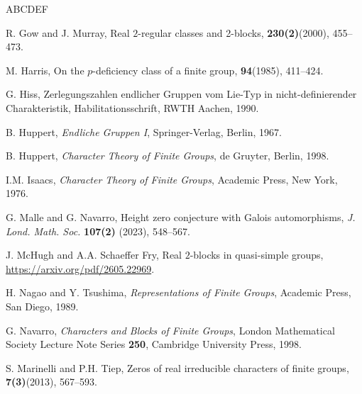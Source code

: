 \documentclass[10pt]{article}
\begin{document}
\begin{thebibliography}{ABCDEF}
   
   
   
   R. Gow and J. Murray,
   \newblock Real $2$-regular classes and 2-blocks,
    {\bf 230(2)}(2000), 455--473.






   M. Harris,
   \newblock On the $p$-deficiency class of a finite group,
    {\bf 94}(1985), 411--424.

   G. Hiss,
   \newblock Zerlegungszahlen endlicher Gruppen vom Lie-Typ in nicht-definierender Charakteristik,
   \newblock Habilitationsschrift, RWTH Aachen, 1990.
   


	B. Huppert,
	\emph{Endliche Gruppen I}, Springer-Verlag, Berlin, 1967.

	B. Huppert,
	\emph{Character Theory of Finite Groups}, de Gruyter, Berlin, 1998.



	I.M. Isaacs,
	\emph{Character Theory of Finite Groups}, Academic Press, New York, 1976.



  
	G. Malle and G. Navarro,
	\newblock Height zero conjecture with Galois automorphisms,
	\newblock \emph{J. Lond. Math. Soc.} {\bf 107(2)} (2023), 548--567. 
   





	J. McHugh and  A.A. Schaeffer Fry,
	\newblock  Real $2$-blocks in quasi-simple groups,
	\href{https://arxiv.org/pdf/2605.22969}{https://arxiv.org/pdf/2605.22969}.

 


  H. Nagao and Y. Tsushima,
  \emph{Representations of Finite Groups}, 
  Academic Press, San Diego, 1989.

  G. Navarro,
  \emph{Characters and Blocks of Finite Groups}, 
  London Mathematical Society Lecture Note Series {\bf 250},
  Cambridge University Press, 1998.




  S. Marinelli and P.H. Tiep,
   \newblock Zeros of real irreducible characters of finite groups,
    {\bf 7(3)}(2013), 567--593.



\end{thebibliography}
\end{document}

